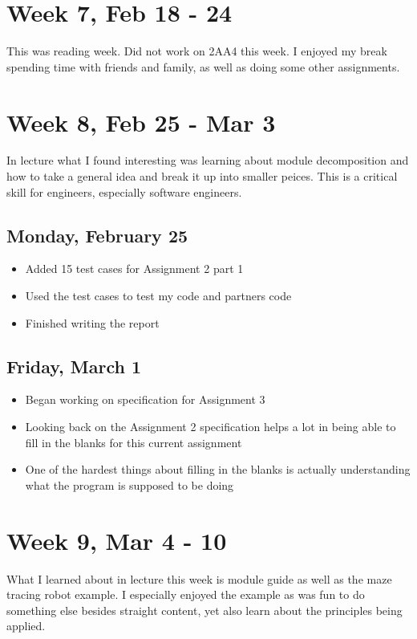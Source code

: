 \documentclass{article}
\begin{document}
\section{Week 7, Feb 18 - 24}

This was reading week. Did not work on 2AA4 this week. I enjoyed my break spending time with friends and family, as well as doing some other assignments.

\section{Week 8, Feb 25 - Mar 3}

In lecture what I found interesting was learning about module decomposition and how to take a general idea and break it up into smaller peices. This is a critical skill for engineers, especially software engineers.

\subsection{Monday, February 25}
\begin{itemize}
    \item Added 15 test cases for Assignment 2 part 1
    \item Used the test cases to test my code and partners code
    \item Finished writing the report
\end{itemize}

\subsection{Friday, March 1}
\begin{itemize}
    \item Began working on specification for Assignment 3
    \item Looking back on the Assignment 2 specification helps a lot in being able to fill in the blanks for this current assignment
    \item One of the hardest things about filling in the blanks is actually understanding what the program is supposed to be doing
\end{itemize}

\section{Week 9, Mar 4 - 10}

What I learned about in lecture this week is module guide as well as the maze tracing robot example. I especially enjoyed the example as was fun to do something else besides straight content, yet also learn about the principles being applied.
\end{document}
